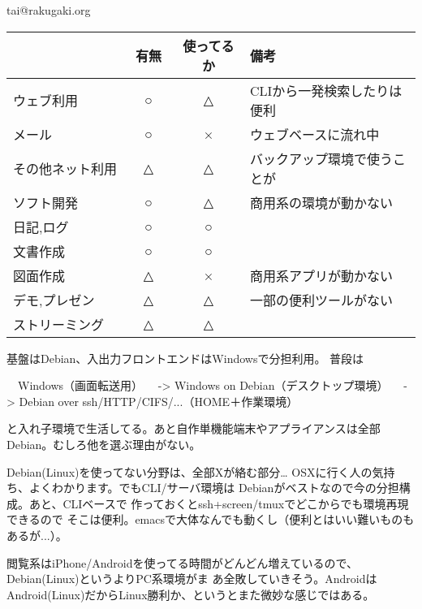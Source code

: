 \begin{prework}{ tai@rakugaki.org }

\begin{center}
{\tiny
\begin{tabular}{|l|c|c|l|}
\hline
& 有無　& 使ってるか & 備考 \\
\hline
ウェブ利用　&○&△& CLIから一発検索したりは便利 \\
メール　&○&×& ウェブベースに流れ中 \\
その他ネット利用　&△&△& バックアップ環境で使うことが \\
ソフト開発　&○&△& 商用系の環境が動かない \\
日記,ログ　&○&○& \\
文書作成　&○&○& \\
図面作成　&△&×& 商用系アプリが動かない \\
デモ,プレゼン　&△&△& 一部の便利ツールがない \\
ストリーミング　&△&△& \\
\hline
\end{tabular}
}
\end{center}
{\tiny
基盤はDebian、入出力フロントエンドはWindowsで分担利用。
普段は
\begin{commandline}
　Windows（画面転送用）
　-> Windows on Debian（デスクトップ環境）
　-> Debian over ssh/HTTP/CIFS/...（HOME＋作業環境）
\end{commandline}
と入れ子環境で生活してる。あと自作単機能端末やアプライアンスは全部Debian。むしろ他を選ぶ理由がない。

Debian(Linux)を使ってない分野は、全部Xが絡む部分…
OSXに行く人の気持ち、よくわかります。でもCLI/サーバ環境は
Debianがベストなので今の分担構成。あと、CLIベースで
作っておくとssh+screen/tmuxでどこからでも環境再現できるので
そこは便利。emacsで大体なんでも動くし（便利とはいい難いものもあるが...）。

閲覧系はiPhone/Androidを使ってる時間がどんどん増えているので、Debian(Linux)というよりPC系環境がま
あ全敗していきそう。AndroidはAndroid(Linux)だからLinux勝利か、というとまた微妙な感じではある。
}
\end{prework}


